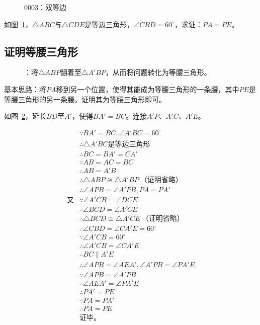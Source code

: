

\begin{figure}[htbp]
  \centering
  \caption{0003：双等边} \label{fig:0003}
\end{figure}

如图~\ref{fig:0003}，$\triangle ABC$与$\triangle CDE$是等边三角形，$\angle CBD = 60^\circ$，求证：$PA = PE$。

\subsection{证明等腰三角形} \label{subsec:0003-istri}

\begin{figure}[htbp]
  \centering
  \caption{：将$\triangle ABP$翻着至$\triangle A'BP$，从而将问题转化为等腰三角形。}
  \label{fig:0003-istri}
\end{figure}

基本思路：将$PA$移到另一个位置，使得其能成为等腰三角形的一条腰，其中$PE$是等腰三角形的另一条腰。证明其为等腰三角形即可。

如图~\ref{fig:0003-istri}，延长$BD$至$A'$，使得$BA' = BC$。连接$A'P$、$A'C$、$A'E$。

\begin{align*}
  &\because   BA' = BC, \angle A'BC = 60^\circ \\
  &\therefore \triangle A'BC \text{是等边三角形} \\
  &\therefore BC = BA' = CA' \\
  &\because   AB = AC = BC \\
  &\therefore AB = A'B \\
  &\therefore \triangle ABP \cong \triangle A'BP \ \text{（证明省略）} \\
  &\therefore \angle APB = \angle A'PB, PA = PA' \\
  \text{又}&\because \angle A'CB = \angle DCE \\
  &\therefore \angle BCD = \angle A'CE \\
  &\therefore \triangle BCD \cong \triangle A'CE \ \text{（证明省略）} \\
  &\therefore \angle CBD = \angle CA'E = 60^\circ \\
  &\because   \angle A'CB = 60^\circ \\
  &\therefore \angle A'CB = \angle CA'E \\
  &\therefore BC \parallel A'E \\
  &\therefore \angle APB = \angle AEA', \angle A'PB = \angle PA'E \\
  &\because   \angle APB = \angle A'PB \\
  &\therefore \angle AEA' = \angle PA'E \\
  &\therefore PA' = PE \\
  &\because   PA = PA' \\
  &\therefore PA = PE \\
  &\text{证毕。} \\
\end{align*}
